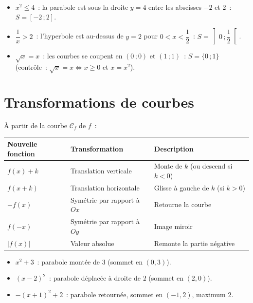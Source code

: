 \begin{ex}
\begin{itemize}
  \item $x^2\leq4$~: la parabole est sous la droite $y=4$ entre les abscisses $-2$ et $2$~: $S=[-2\,;2]$.
  \item $\dfrac1x>2$~: l'hyperbole est au-dessus de $y=2$ pour $0<x<\dfrac12$~: $S=\left]0\,;\dfrac12\right[$.
  \item $\sqrt x=x$~: les courbes se coupent en $(0\,;0)$ et $(1\,;1)$~: $S=\{0\,;1\}$
        (contr\^ole~: $\sqrt x=x\Leftrightarrow x\geq0$ et $x=x^2$).
\end{itemize}
\end{ex}

\section{Transformations de courbes}


\begin{prop}
\`A partir de la courbe $\mathcal{C}_f$ de $f$~:
\begin{center}
\small
\renewcommand{\arraystretch}{1.4}
\begin{tabularx}{\linewidth}{|l|l|X|}
\hline
\rowcolor{BN!10} Nouvelle fonction & Transformation & Description \\
\hline
$f(x)+k$ & Translation verticale & Monte de $k$ (ou descend si $k<0$) \\
$f(x+k)$ & Translation horizontale & Glisse \`a gauche de $k$ (si $k>0$) \\
$-f(x)$ & Sym\'etrie par rapport \`a $Ox$ & Retourne la courbe \\
$f(-x)$ & Sym\'etrie par rapport \`a $Oy$ & Image miroir \\
$|f(x)|$ & Valeur absolue & Remonte la partie n\'egative \\
\hline
\end{tabularx}
\end{center}
\end{prop}

\begin{ex}[Transformations de $x^2$]
\begin{itemize}
  \item $x^2+3$~: parabole mont\'ee de $3$ (sommet en $(0,3)$).
  \item $(x-2)^2$~: parabole d\'eplac\'ee \`a droite de $2$ (sommet en $(2,0)$).
  \item $-(x+1)^2+2$~: parabole retourn\'ee, sommet en $(-1,2)$, maximum $2$.
\end{itemize}
\end{ex}

